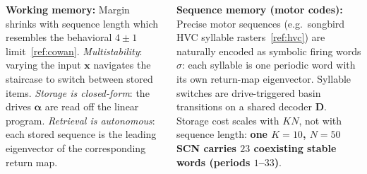 \documentclass[25pt, a0paper, portrait, margin=15mm, innermargin=15mm,
               blockverticalspace=12mm, colspace=12mm, subcolspace=8mm]{tikzposter}
\newcommand{\vv}[1]{\mathbf{#1}}
\newcommand{\xx}{\vv{x}}
\begin{document}
\begin{columns}
{\begin{minipage}[t]{\linewidth}
\vspace{2mm}
{\centering
\setlength{\fboxsep}{2pt}%
\colorbox{navy!7}{\parbox{0.96\linewidth}{%
  \normalsize
  \textbf{\color{accent}Working memory:}\;
  Margin shrinks with sequence length which resembles the behavioral $4{\pm}1$ limit~\ref{ref:cowan}. \emph{Multistability}: varying the input $\xx$ navigates the staircase to switch between stored items.
  \emph{Storage is closed-form}: the drives $\bm{\alpha}$ are read off the linear program.
  \emph{Retrieval is autonomous}: each stored sequence is the leading eigenvector of the corresponding return map. %
}}\par}

\vspace{2mm}
{\centering
\setlength{\fboxsep}{2pt}%
\colorbox{navy!7}{\parbox{0.96\linewidth}{%
  \vspace{1mm}\normalsize
  \textbf{\color{accent}Sequence memory (motor codes):}\;
  Precise motor sequences (e.g.\ songbird HVC syllable rasters~\ref{ref:hvc}) are naturally encoded as symbolic firing words $\sigma$: each syllable is one periodic word with its own return-map eigenvector. Syllable switches are drive-triggered basin transitions on a shared decoder $\vv{D}$. Storage cost scales with $KN$, not with sequence length: \textbf{one $K{=}10$, $N{=}50$ SCN carries $23$ coexisting stable words (periods $1$--$33$)}.%
  \vspace{1mm}
}}\par}
\end{minipage}
}
\end{columns}
\end{document}
